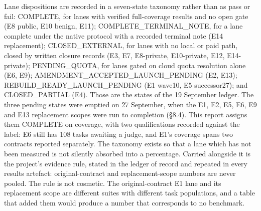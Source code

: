 \documentclass[12pt,a4paper]{report}
\begin{document}
Lane dispositions are recorded in a seven-state taxonomy rather than as
pass or fail: COMPLETE, for lanes with verified full-coverage results
and no open gate (E8 public, E10 benign, E11); COMPLETE\_\allowbreak{}TERMINAL\_\allowbreak{}NOTE,
for a lane complete under the native protocol with a recorded terminal
note (E14 replacement); CLOSED\_EXTERNAL, for lanes with no local or
paid path, closed by written closure records (E3, E7, E8-private,
E10-private, E12, E14-private); PENDING\_QUOTA, for lanes gated on cloud
quota resolution alone (E6, E9); AMENDMENT\_\allowbreak{}ACCEPTED\_\allowbreak{}LAUNCH\_\allowbreak{}PENDING
(E2, E13); REBUILD\_\allowbreak{}READY\_\allowbreak{}LAUNCH\_\allowbreak{}PENDING (E1 wave10, E5 successor27);
and CLOSED\_PARTIAL (E4). Those are the states of the 19 September
ledger. The three pending states were emptied on 27 September, when the
E1, E2, E5, E6, E9 and E13 replacement scopes were run to completion
(§8.4). This report assigns them COMPLETE on coverage, with two
qualifications recorded against the label: E6 still has 108 tasks
awaiting a judge, and E1's coverage spans two contracts reported
separately. The taxonomy exists so that a lane which has not been
measured is not silently absorbed into a percentage. Carried alongside
it is the project's evidence rule, stated in the ledger of record and
repeated in every results artefact: original-contract and
replacement-scope numbers are never pooled. The rule is not cosmetic.
The original-contract E1 lane and its replacement scope are different
suites with different task populations, and a table that added them
would produce a number that corresponds to no benchmark.
\end{document}
